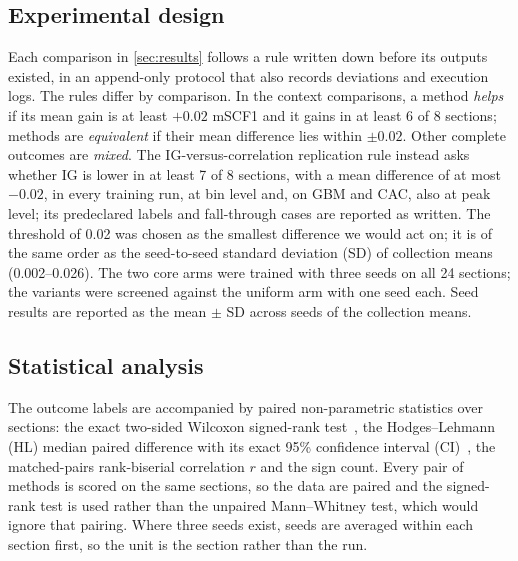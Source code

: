 \subsection{Experimental design}
\label{sec:design}
Each comparison in \cref{sec:results} follows a rule written down before its
outputs existed, in an append-only protocol that also records deviations and
execution logs. The rules differ by comparison. In the context comparisons,
a method \emph{helps} if its mean gain is at least $+0.02$ mSCF1 and it gains
in at least 6 of 8 sections; methods are \emph{equivalent} if their mean
difference lies within $\pm0.02$. Other complete outcomes are \emph{mixed}.
The IG-versus-correlation replication rule instead asks whether IG is lower
in at least 7 of 8 sections, with a mean difference of at most $-0.02$, in
every training run, at bin level and, on GBM
and CAC, also at peak level; its predeclared labels and fall-through cases are
reported as written. The threshold of 0.02 was chosen as the
smallest difference we would act on; it is of the same order as the
seed-to-seed standard deviation (SD) of collection means (0.002--0.026).
The two core arms were trained with
three seeds on all 24 sections; the variants were screened against the uniform
arm with one seed each. Seed results are reported as the mean $\pm$ SD across
seeds of the collection means.

\subsection{Statistical analysis}
\label{sec:stats}
The outcome labels are accompanied by paired non-parametric statistics over
sections: the exact two-sided Wilcoxon signed-rank
test~\citep{wilcoxon1945individual}, the Hodges--Lehmann (HL) median paired
difference with its exact 95\% confidence interval (CI)~\citep{hodges1963estimates},
the matched-pairs rank-biserial correlation $r$ and the sign count. Every pair
of methods is scored on the same sections, so the data are paired and the
signed-rank test is used rather than the unpaired Mann--Whitney test, which
would ignore that pairing. Where three seeds exist, seeds are averaged within
each section first, so the unit is the section rather than the run.

